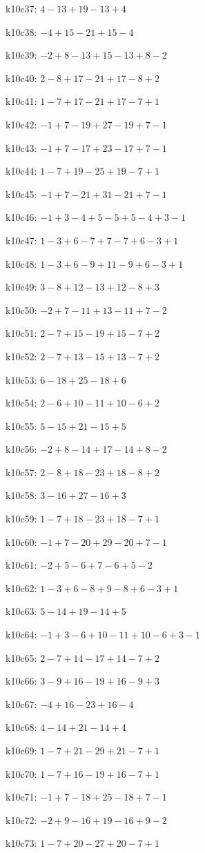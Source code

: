 k10c37: $ 4-13+19-13+4 $ 

k10c38: $ -4+15-21+15-4 $ 

k10c39: $ -2+8-13+15-13+8-2 $ 

k10c40: $ 2-8+17-21+17-8+2 $ 

k10c41: $ 1-7+17-21+17-7+1 $ 

k10c42: $ -1+7-19+27-19+7-1 $ 

k10c43: $ -1+7-17+23-17+7-1 $ 

k10c44: $ 1-7+19-25+19-7+1 $ 

k10c45: $ -1+7-21+31-21+7-1 $ 

k10c46: $ -1+3-4+5-5+5-4+3-1 $ 

k10c47: $ 1-3+6-7+7-7+6-3+1 $ 

k10c48: $ 1-3+6-9+11-9+6-3+1 $ 

k10c49: $ 3-8+12-13+12-8+3 $ 

k10c50: $ -2+7-11+13-11+7-2 $ 

k10c51: $ 2-7+15-19+15-7+2 $ 

k10c52: $ 2-7+13-15+13-7+2 $ 

k10c53: $ 6-18+25-18+6 $ 

k10c54: $ 2-6+10-11+10-6+2 $ 

k10c55: $ 5-15+21-15+5 $ 

k10c56: $ -2+8-14+17-14+8-2 $ 

k10c57: $ 2-8+18-23+18-8+2 $ 

k10c58: $ 3-16+27-16+3 $ 

k10c59: $ 1-7+18-23+18-7+1 $ 

k10c60: $ -1+7-20+29-20+7-1 $ 

k10c61: $ -2+5-6+7-6+5-2 $ 

k10c62: $ 1-3+6-8+9-8+6-3+1 $ 

k10c63: $ 5-14+19-14+5 $ 

k10c64: $ -1+3-6+10-11+10-6+3-1 $ 

k10c65: $ 2-7+14-17+14-7+2 $ 

k10c66: $ 3-9+16-19+16-9+3 $ 

k10c67: $ -4+16-23+16-4 $ 

k10c68: $ 4-14+21-14+4 $ 

k10c69: $ 1-7+21-29+21-7+1 $ 

k10c70: $ 1-7+16-19+16-7+1 $ 

k10c71: $ -1+7-18+25-18+7-1 $ 

k10c72: $ -2+9-16+19-16+9-2 $ 

k10c73: $ 1-7+20-27+20-7+1 $ 

